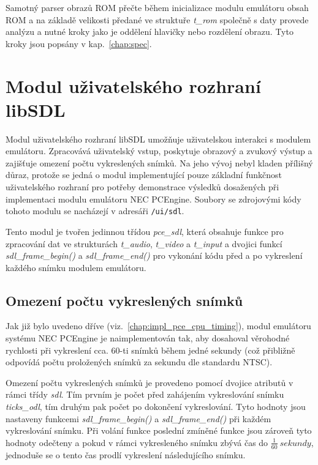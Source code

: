 Samotný parser obrazů ROM přečte během inicializace modulu emulátoru obsah ROM
a na základě velikosti předané ve struktuře {\it t\_rom} společně s daty
provede analýzu a nutné kroky jako je oddělení hlavičky nebo rozdělení obrazu.
Tyto kroky jsou popsány v kap.~\ref{chap:spec}.


\section{Modul uživatelského rozhraní libSDL}\label{chap:impl_sdl}

Modul uživatelského rozhraní libSDL umožňuje uživatelskou interakci s modulem
emulátoru. Zpracovává uživatelský vstup, poskytuje obrazový a zvukový výstup a
zajišťuje omezení počtu vykreslených snímků. Na jeho vývoj nebyl kladen
přílišný důraz, protože se jedná o modul implementující pouze základní
funkčnost uživatelského rozhraní pro potřeby demonstrace výsledků dosažených
při implementaci modulu emulátoru NEC PCEngine. Soubory se zdrojovými kódy
tohoto modulu se nacházejí v adresáři {\tt /ui/sdl}.

Tento modul je tvořen jedinnou třídou {\em pce\_sdl}, která obsahuje funkce pro
zpracování dat ve strukturách {\it t\_audio}, {\it t\_video} a {\it t\_input} a
dvojici funkcí {\it sdl\_frame\_begin()} a {\it sdl\_frame\_end()} pro vykonání
kódu před a po vykreslení každého snímku modulem emulátoru.

\subsection{Omezení počtu vykreslených snímků}\label{chap:impl_sdl_timing}

Jak již bylo uvedeno dříve (viz.~\ref{chap:impl_pce_cpu_timing}), modul
emulátoru systému NEC PCEngine je naimplementován tak, aby dosahoval věrohodné
rychlosti při vykreslení cca. 60-ti snímků během jedné sekundy (což přibližně
odpovídá počtu proložených snímků za sekundu dle standardu NTSC).

Omezení počtu vykreslených snímků je provedeno pomocí dvojice atributů v rámci
třídy {\em sdl}. Tím prvním je počet  před zahájením vykreslování
snímku {\em ticks\_odl}, tím druhým pak počet  po dokončení
vykreslování. Tyto hodnoty jsou nastaveny funkcemi {\it sdl\_frame\_begin()} a
{\it sdl\_frame\_end()} při každém vykreslování snímku. Při volání funkce
poslední zmíněné funkce jsou zároveň tyto hodnoty odečteny a pokud v rámci
vykresleného snímku zbývá čas do $\frac{1}{60}~sekundy$, jednoduše se o tento
čas prodlí vykreslení následujícího snímku.

